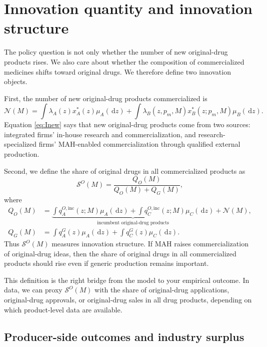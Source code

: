 \documentclass[12pt]{article}
\newcommand{\1}{\mathbf{1}}
\newcommand{\dd}{\,\mathrm{d}}
\newcommand{\Inew}{\mathcal{N}}
\newcommand{\ShareO}{\mathcal{S}^O}
\begin{document}
\section{Innovation quantity and innovation structure}

The policy question is not only whether the number of new original-drug products rises. We also care about whether the composition of commercialized medicines shifts toward original drugs. We therefore define two innovation objects.

First, the number of new original-drug products commercialized is
\begin{equation}
\Inew(M)=
\int \lambda_A(z)x_A^*(z)\mu_A(\dd z)
+
\int \lambda_B(z,p_m,M)x_B^*(z;p_m,M)\mu_B(\dd z).
\label{eq:Inew}
\end{equation}
Equation \eqref{eq:Inew} says that new original-drug products come from two sources: integrated firms' in-house research and commercialization, and research-specialized firms' MAH-enabled commercialization through qualified external production.

Second, we define the share of original drugs in all commercialized products as
\begin{equation}
\ShareO(M)=
\frac{Q_O(M)}{Q_O(M)+Q_G(M)},
\label{eq:shareO}
\end{equation}
where
\begin{align}
Q_O(M)
&=
\underbrace{\int q_A^{O,\mathrm{inc}}(z;M)\mu_A(\dd z)+\int q_C^{O,\mathrm{inc}}(z;M)\mu_C(\dd z)}_{\text{incumbent original-drug products}}
+\Inew(M),
\label{eq:QO}\\
Q_G(M)
&=
\int q_A^G(z)\mu_A(\dd z)+\int q_C^G(z)\mu_C(\dd z).
\label{eq:QG}
\end{align}
Thus $\ShareO(M)$ measures innovation structure. If MAH raises commercialization of original-drug ideas, then the share of original drugs in all commercialized products should rise even if generic production remains important.

This definition is the right bridge from the model to your empirical outcome. In data, we can proxy $\ShareO(M)$ with the share of original-drug applications, original-drug approvals, or original-drug sales in all drug products, depending on which product-level data are available.

\subsection{Producer-side outcomes and industry surplus}
\end{document}
